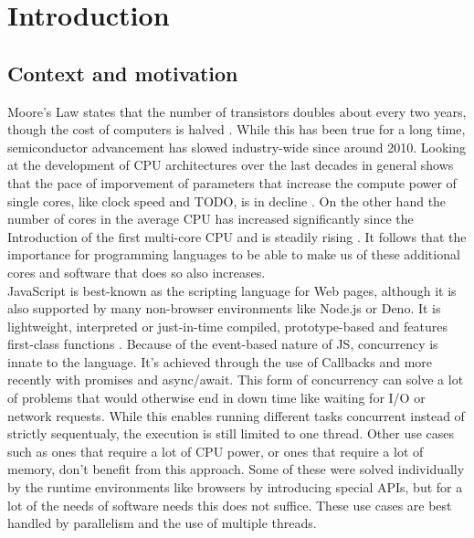 \clearpage

\chapter{\textbf{Introduction}}\label{objectives}

\section{Context and motivation}

Moore's Law states that the number of transistors doubles about every two
years, though the cost of computers is halved \cite*{todo}. While this has been
true for a long time, semiconductor advancement has slowed industry-wide since
around 2010. Looking at the development of CPU architectures over the last
decades in general shows that the pace of imporvement of parameters that
increase the compute power of single cores, like clock speed and TODO, is in
decline \cite{todo}. On the other hand the number of cores in the average CPU
has increased significantly since the Introduction of the first multi-core CPU
and is steadily rising \cite{todo}. It follows that the importance for
programming languages to be able to make us of these additional cores and
software that does so also increases. \\

JavaScript is best-known as the scripting language for Web pages, although it
is also supported by many non-browser environments like Node.js or Deno. It is
lightweight, interpreted or just-in-time compiled, prototype-based and features
first-class functions \cite*{mdn_js}. Because of the event-based nature of JS,
concurrency is innate to the language. It's achieved through the use of
Callbacks and more recently with promises and async/await. This form of
concurrency can solve a lot of problems that would otherwise end in down time
like waiting for I/O or network requests. While this enables running different
tasks concurrent instead of strictly sequentualy, the execution is still
limited to one thread. Other use cases such as ones that require a lot of CPU
power, or ones that require a lot of memory, don't benefit from this approach.
Some of these were solved individually by the runtime environments like
browsers by introducing special APIs, but for a lot of the needs of software
needs this does not suffice. These use cases are best handled by parallelism
and the use of multiple threads. \\

